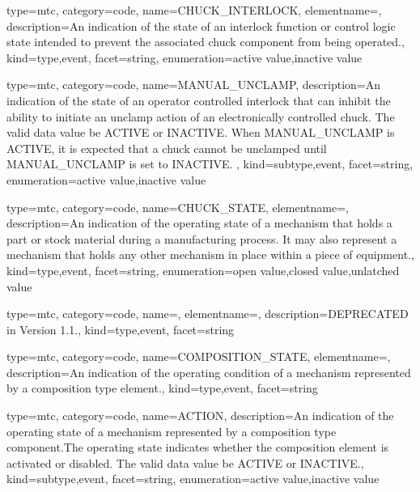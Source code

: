 {
  type=mtc,
  category=code,
  name={CHUCK\_INTERLOCK},
  elementname=,
  description={An indication of the state of an interlock function or control logic state intended to prevent the associated \gls{chuck} component from being operated.},
  kind={type,event},
  facet={\gls{string}},
  enumeration={\gls{active value},\gls{inactive value}}
}


{
  type=mtc,
  category=code,
  name={MANUAL\_UNCLAMP},
  description={An indication of the state of an operator controlled interlock that can inhibit the ability to initiate an unclamp action of an electronically controlled chuck.  The \gls{valid data value} \must be ACTIVE or INACTIVE. \newline When MANUAL\_UNCLAMP is ACTIVE, it is expected that a chuck cannot be unclamped until MANUAL\_UNCLAMP is set to INACTIVE. },
  kind={subtype,event},
  facet={\gls{string}},
  enumeration={\gls{active value},\gls{inactive value}}
}


{
  type=mtc,
  category=code,
  name={CHUCK\_STATE},
  elementname=,
  description={An indication of the operating state of a mechanism that holds a part or stock material during a manufacturing process. It may also represent a mechanism that holds any other mechanism in place within a piece of equipment.},
  kind={type,event},
  facet={\gls{string}},
  enumeration={\gls{open value},\gls{closed value},\gls{unlatched value}}
}


{
  type=mtc,
  category=code,
  name=,
  elementname=,
  description={DEPRECATED in Version 1.1.},
  kind={type,event},
  facet={\gls{string}}
}


{
  type=mtc,
  category=code,
  name={COMPOSITION\_STATE},
  elementname=,
  description={An indication of the operating condition of a mechanism represented by a \gls{composition} type element.},
  kind={type,event},
  facet={\gls{string}}
}


{
  type=mtc,
  category=code,
  name={ACTION},
  description={An indication of the operating state of a mechanism represented by a \gls{composition} type component.The operating state indicates whether the \gls{composition} element is activated or disabled. The \gls{valid data value} \must be ACTIVE or INACTIVE.},
  kind={subtype,event},
  facet={\gls{string}},
  enumeration={\gls{active value},\gls{inactive value}}
}


